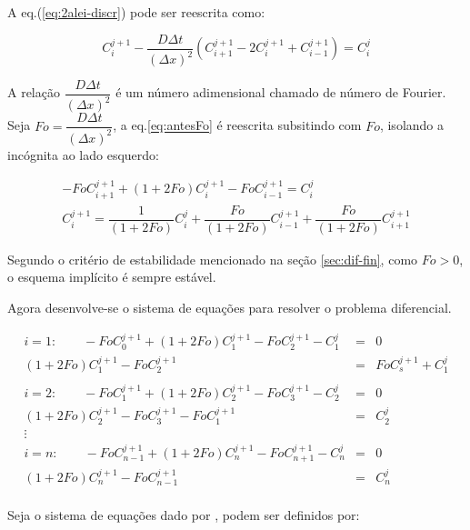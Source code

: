 A eq.(\ref{eq:2alei-discr}) pode ser reescrita como:

\begin{equation}
\label{eq:antesFo}
C_i^{j+1} - \frac{D\Delta t}{(\Delta x)^2} (C_{i+1}^{j+1} - 2C_i^{j+1} + C_{i-1}^{j+1}) = C_i^j
\end{equation}

A relação $\dfrac{D\Delta t}{(\Delta x)^2}$ é um número adimensional chamado de número de Fourier. Seja $Fo = \dfrac{D\Delta t}{(\Delta x)^2} $, a eq.\ref{eq:antesFo} é reescrita subsitindo com $Fo$, isolando a incógnita ao lado esquerdo:

\begin{gather*}
\label{eq:depoisFo}
- FoC_{i+1}^{j+1} + (1+2Fo)C_i^{j+1} - FoC_{i-1}^{j+1} = C_i^j \\
C_i^{j+1} = \dfrac{1}{(1+2Fo)}C_i^j + \dfrac{Fo}{(1+2Fo)}C_{i-1}^{j+1} + \dfrac{Fo}{(1+2Fo)}C_{i+1}^{j+1}
\end{gather*}

Segundo o critério de estabilidade mencionado na seção \ref{sec:dif-fin}, como $Fo>0$, o esquema implícito é sempre estável.

Agora desenvolve-se o sistema de equações para resolver o problema diferencial.

\begin{equation*}
\label{eq:depoisFo}
\begin{matrix}
i = 1: \qquad -FoC_{0}^{j+1} + (1+2Fo)C_1^{j+1} - FoC_{2}^{j+1} - C_1^j & = & 0\\
(1+2Fo)C_1^{j+1} - FoC_{2}^{j+1}& = & FoC_{s}^{j+1}  + C_1^j \\ 
\\
i = 2: \qquad -FoC_{1}^{j+1} + (1+2Fo)C_2^{j+1} - FoC_{3}^{j+1} - C_2^j & = & 0\\
(1+2Fo)C_2^{j+1} - FoC_{3}^{j+1} - FoC_{1}^{j+1} & = & C_2^j \\ 
\vdots \\
i = n: \qquad -FoC_{n-1}^{j+1} + (1+2Fo)C_n^{j+1} - FoC_{n+1}^{j+1} - C_n^j & = & 0\\
(1+2Fo)C_n^{j+1} - FoC_{n-1}^{j+1} & = & C_n^j \\ 
\end{matrix}
\end{equation*}

Seja o sistema de equações dado por ,  podem ser definidos por:

